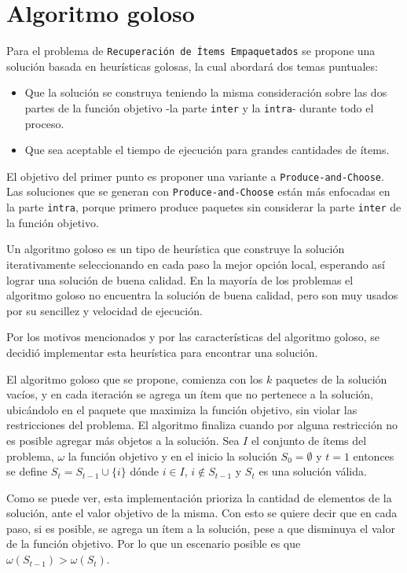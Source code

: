 \section{Algoritmo goloso}

Para el problema de \texttt{Recuperación de Ítems Empaquetados} se propone una solución basada en heurísticas golosas, la cual abordará dos temas puntuales:
\begin{itemize}
	\item Que la solución se construya teniendo la misma consideración sobre las dos partes de la función objetivo -la parte \texttt{inter} y la \texttt{intra}- durante todo el proceso.
	\item Que sea aceptable el tiempo de ejecución para grandes cantidades de ítems.
\end{itemize}

El objetivo del primer punto es proponer una variante a \texttt{Produce-and-Choose}. Las soluciones que se generan con \texttt{Produce-and-Choose} están más enfocadas en la parte \texttt{intra}, porque primero produce paquetes sin considerar la parte \texttt{inter} de la función objetivo.

Un algoritmo goloso es un tipo de heurística que construye la solución iterativamente seleccionando en cada paso la mejor opción local, esperando así lograr una solución de buena calidad. En la mayoría de los problemas el algoritmo goloso no encuentra la solución de buena calidad, pero son muy usados por su sencillez y velocidad de ejecución.

Por los motivos mencionados y por las características del algoritmo goloso, se decidió implementar esta heurística para encontrar una solución. 

El algoritmo goloso que se propone, comienza con los $k$ paquetes de la solución vacíos, y en cada iteración se agrega un ítem que no pertenece a la solución, ubicándolo en el paquete que maximiza la función objetivo, sin violar las restricciones del problema. El algoritmo finaliza cuando por alguna restricción no es posible agregar más objetos a la solución. Sea $I$ el conjunto de ítems del problema, $\omega$ la función objetivo y en el inicio la solución $S_0 = \emptyset$ y $t=1$ entonces se define $S_t = S_{t-1} \cup \{i\}$ dónde $i \in I$, $i \notin S_{t-1}$ y $S_t$ es una solución válida. 

Como se puede ver, esta implementación prioriza la cantidad de elementos de la solución, ante el valor objetivo de la misma. Con esto se quiere decir que en cada paso, si es posible, se agrega un ítem a la solución, pese a que disminuya el valor de la función objetivo. Por lo que un escenario posible es que $\omega(S_{t-1}) > \omega(S_t)$.

